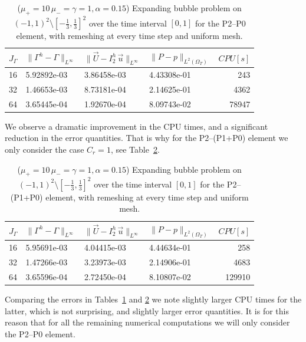 \documentclass[a4paper,12pt,onecolumn]{article}
\newcommand{\errorXx}{\|\Gamma^h - \Gamma\|_{L^\infty}}
\newcommand{\errorUu}[1]{\|\vec U - I^h_{#1}\,\vec u\|_{L^\infty}}
\newcommand{\LerrorPp}{\|P - p\|_{L^2(\Omega_T)}}
\begin{document}
\begin{table}
\center
\begin{tabular}{llllr}
\hline
$J_\Gamma$ & $\errorXx$ & $\errorUu2$ & $\LerrorPp$ & $CPU[s]$\\
\hline
16 & 5.92892e-03 & 3.86458e-03 & 4.43308e-01 &   243 \\
32 & 1.46653e-03 & 8.73181e-04 & 2.14625e-01 &  4362 \\
64 & 3.65445e-04 & 1.92670e-04 & 8.09743e-02 & 78947 \\
\hline
\end{tabular}
\caption{($\mu_+ = 10\,\mu_- = \gamma = 1,\alpha = 0.15$) Expanding bubble
problem on $(-1,1)^2\setminus[-\frac{1}{3},\frac{1}{3}]^2$ over the time
interval $[0,1]$ for the P2--P0 element, with remeshing at every time step and
uniform mesh.}
\label{tab:expandingbubble2Dp2p0remesh}
\end{table}
We observe a dramatic improvement in the CPU times, and a significant reduction
in the error quantities. That is why for the P2--(P1+P0) element we only
consider the case $C_r = 1$, see
Table~\ref{tab:expandingbubble2Dp2p1p0remesh}.
\begin{table}
 \center
\begin{tabular}{llllr}
\hline
$J_\Gamma$ & $\errorXx$ & $\errorUu2$ & $\LerrorPp$ & $CPU[s]$ \\
\hline
16 & 5.95691e-03 & 4.04415e-03 & 4.44634e-01 &    258 \\
32 & 1.47266e-03 & 3.23973e-03 & 2.14906e-01 &   4683 \\
64 & 3.65596e-04 & 2.72450e-04 & 8.10807e-02 & 129910 \\
\hline
\end{tabular}
\caption{($\mu_+ = 10\,\mu_- = \gamma = 1,\alpha = 0.15$) Expanding bubble
problem on $(-1,1)^2\setminus[-\frac{1}{3},\frac{1}{3}]^2$ over the time
interval $[0,1]$ for the P2--(P1+P0) element, with remeshing at every time step
and uniform mesh.}
\label{tab:expandingbubble2Dp2p1p0remesh}
\end{table}
Comparing the errors in Tables~\ref{tab:expandingbubble2Dp2p0remesh} and
\ref{tab:expandingbubble2Dp2p1p0remesh} we note slightly larger CPU times
for the latter, which is not surprising, and slightly larger error quantities.
It is for this reason that for all the remaining numerical computations we will
only consider the P2--P0 element.
\end{document}
